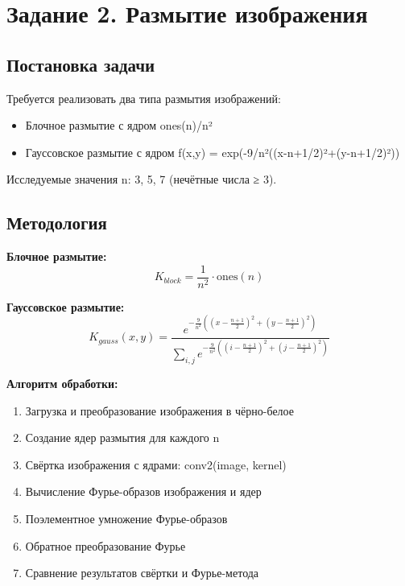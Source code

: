\section*{Задание 2. Размытие изображения}

\subsection*{Постановка задачи}

Требуется реализовать два типа размытия изображений:
\begin{itemize}
    \item Блочное размытие с ядром ones(n)/n²
    \item Гауссовское размытие с ядром f(x,y) = exp(-9/n²((x-n+1/2)²+(y-n+1/2)²))
\end{itemize}

Исследуемые значения n: 3, 5, 7 (нечётные числа ≥ 3).

\subsection*{Методология}

\textbf{Блочное размытие:}
\begin{equation}
K_{block} = \frac{1}{n^2} \cdot \text{ones}(n)
\end{equation}

\textbf{Гауссовское размытие:}
\begin{equation}
K_{gauss}(x,y) = \frac{e^{-\frac{9}{n^2}\left((x-\frac{n+1}{2})^2 + (y-\frac{n+1}{2})^2\right)}}{\sum_{i,j} e^{-\frac{9}{n^2}\left((i-\frac{n+1}{2})^2 + (j-\frac{n+1}{2})^2\right)}}
\end{equation}

\textbf{Алгоритм обработки:}
\begin{enumerate}
    \item Загрузка и преобразование изображения в чёрно-белое
    \item Создание ядер размытия для каждого n
    \item Свёртка изображения с ядрами: conv2(image, kernel)
    \item Вычисление Фурье-образов изображения и ядер
    \item Поэлементное умножение Фурье-образов
    \item Обратное преобразование Фурье
    \item Сравнение результатов свёртки и Фурье-метода
\end{enumerate}

